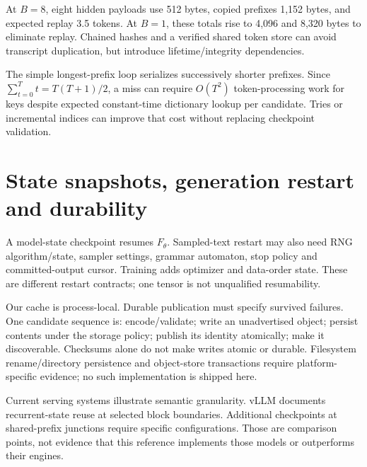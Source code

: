 At $B=8$, eight hidden payloads use 512 bytes, copied prefixes 1,152 bytes,
and expected replay 3.5 tokens. At $B=1$, these totals rise to 4,096 and
8,320 bytes to eliminate replay. Chained hashes and a verified shared token
store can avoid transcript duplication, but introduce lifetime/integrity
dependencies.

The simple longest-prefix loop serializes successively shorter prefixes.
Since $\sum_{t=0}^{T}t=T(T+1)/2$, a miss can require $O(T^2)$ token-processing
work for keys despite expected constant-time dictionary lookup per candidate.
Tries or incremental indices can improve that cost without replacing
checkpoint validation.

\section{State snapshots, generation restart and durability}

A model-state checkpoint resumes $F_\theta$. Sampled-text restart may also
need RNG algorithm/state, sampler settings, grammar automaton, stop policy
and committed-output cursor. Training adds optimizer and data-order state.
These are different restart contracts; one tensor is not unqualified
resumability.

Our cache is process-local. Durable publication must specify survived failures.
One candidate sequence is: encode/validate; write an unadvertised object;
persist contents under the storage policy; publish its identity atomically;
make it discoverable. Checksums alone do not make writes atomic or durable.
Filesystem rename/directory persistence and object-store transactions require
platform-specific evidence; no such implementation is shipped here.

Current serving systems illustrate semantic granularity. vLLM documents
recurrent-state reuse at selected block boundaries. Additional checkpoints
at shared-prefix junctions require specific configurations.\cite{vllm-apc,vllm-args}
Those are comparison points, not evidence that this reference implements
those models or outperforms their engines.


